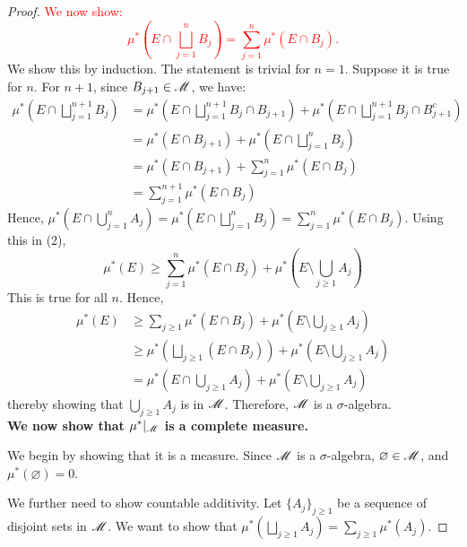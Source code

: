\begin{proof}
    \textcolor{red}{We now show:
    \begin{equation}
        \mu^*\left(E \cap \bigsqcup_{j = 1}^n B_j\right) = \sum_{j = 1}^n \mu^*(E \cap B_j).    
    \end{equation}}               
    We show this by induction. The statement is trivial for $n = 1$. Suppose it is true for $n$. For $n + 1$, since $B_{j + 1} \in \mathscr{M}$, we have:
    \begin{align*}
        \mu^*\left(E \cap \bigsqcup_{j = 1}^{n+1} B_j\right) 
        &= \mu^*\left(E \cap \bigsqcup_{j = 1}^{n+1} B_j \cap B_{j + 1}\right) + \mu^*\left(E \cap \bigsqcup_{j = 1}^{n+1} B_j \cap B_{j + 1}^c \right) \\
        &= \mu^*(E \cap B_{j + 1}) + \mu^*\left( E \cap \bigsqcup_{j = 1}^{n} B_j\right) \\
        &= \mu^*(E \cap B_{j + 1}) + \sum_{j = 1}^n \mu^*(E \cap B_j) \\
        &= \sum_{j = 1}^{n+1} \mu^*(E \cap B_j)
    \end{align*}
    Hence, $\mu^*\left( E \cap \bigcup_{j = 1}^n A_j \right) = \mu^*\left( E \cap \bigsqcup_{j = 1}^n B_j \right) = \sum_{j = 1}^n \mu^*(E \cap B_j)$. Using this in (2),
    \[ \mu^*(E) \geq \sum_{j = 1}^n \mu^*(E \cap B_j) +  \mu^*\left( E \setminus \bigcup_{j \geq 1} A_j\right) \]
    This is true for all $n$. Hence, 
    \begin{align*}
        \mu^*(E) &\geq \sum_{j \geq 1} \mu^*(E \cap B_j) + \mu^*\left( E \setminus \bigcup_{j \geq 1} A_j\right) \\
        &\geq \mu^*\left( \bigsqcup_{j \geq 1} (E \cap B_j) \right) + \mu^*\left( E \setminus \bigcup_{j \geq 1} A_j\right) \tag*{(by subadditivity)}\\
        &= \mu^*\left( E \cap \bigcup_{j \geq 1} A_j \right) + \mu^*\left( E \setminus \bigcup_{j \geq 1} A_j\right)
    \end{align*}
    thereby showing that $\bigcup_{j \geq 1} A_j$ is in $\mathscr{M}$. Therefore, $\mathscr{M}$ is a $\sigma$-algebra. \\

    \textbf{We now show that $\mu^*|_{\mathscr{M}}$ is a complete measure.}
    
    We begin by showing that it is a measure. Since $\mathscr{M}$ is a $\sigma$-algebra, $\varnothing \in \mathscr{M}$, and $\mu^*(\varnothing) = 0$. 
    
    We further need to show countable additivity. Let $\{ A_j \}_{j \geq 1}$ be a sequence of disjoint sets in $\mathscr{M}$. We want to show that $\mu^*\left( \bigsqcup_{j \geq 1} A_j \right) = \sum_{j \geq 1} \mu^*(A_j)$.
    

\end{proof}
